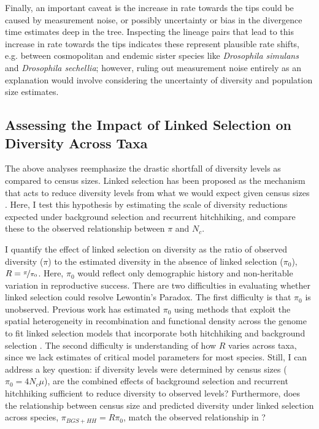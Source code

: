 \documentclass[9pt,lineno]{elife}
\begin{document}
Finally, an important caveat is the increase in rate towards the tips could be
caused by measurement noise, or possibly uncertainty or bias in the divergence
time estimates deep in the tree. Inspecting the lineage pairs that lead to this
increase in rate towards the tips indicates these represent plausible rate
shifts, e.g.  between cosmopolitan and endemic sister species like
\emph{Drosophila simulans} and \emph{Drosophila sechellia}; however, ruling out
measurement noise entirely as an explanation would involve considering the
uncertainty of diversity and population size estimates.

\subsection{Assessing the Impact of Linked Selection on Diversity Across Taxa}

The above analyses reemphasize the drastic shortfall of diversity levels as
compared to census sizes. Linked selection has been proposed as the mechanism
that acts to reduce diversity levels from what we would expect given census
sizes \citep{Maynard_Smith1974-zr,Gillespie2000-mh,Corbett-Detig2015-gt}.
Here, I test this hypothesis by estimating the scale of diversity reductions
expected under background selection and recurrent hitchhiking, and compare
these to the observed relationship between $\pi$ and $N_c$. 

I quantify the effect of linked selection on diversity as the ratio of observed
diversity ($\pi$) to the estimated diversity in the absence of linked selection
($\pi_0$), $R = \nicefrac{\pi}{\pi_0}$. Here, $\pi_0$ would reflect only
demographic history and non-heritable variation in reproductive success. There
are two difficulties in evaluating whether linked selection could resolve
Lewontin's Paradox. The first difficulty is that $\pi_0$ is unobserved.
Previous work has estimated $\pi_0$ using methods that exploit the spatial
heterogeneity in recombination and functional density across the genome to fit
linked selection models that incorporate both hitchhiking and background
selection \citep{Elyashiv2016-vt,Corbett-Detig2015-gt}. The second
difficulty is understanding of how $R$ varies across taxa, since we lack
estimates of critical model parameters for most species. Still, I can address a
key question: if diversity levels were determined by census sizes ($\pi_0 =
4N_c \mu$), are the combined effects of background selection and recurrent
hitchhiking sufficient to reduce diversity to observed levels? Furthermore,
does the relationship between census size and predicted diversity under linked
selection across species, $\pi_{BGS+HH} = R \pi_0$, match the observed
relationship in ? 
\end{document}
